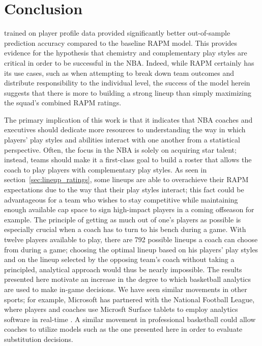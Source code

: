 \chapter{Conclusion}
\label{conclusion}

 trained on player
profile data provided significantly better out-of-sample prediction accuracy
compared to the baseline RAPM model. This provides evidence for the hypothesis that
chemistry and complementary play styles are critical in order to be successful in
the NBA.  Indeed, while RAPM certainly has its use cases, such as when attempting to
break down team outcomes and distribute responsibility to the individual level, the
success of the model herein suggests that there is more to building a strong lineup
than simply maximizing the squad's combined RAPM ratings.

The primary implication of this work is that it indicates that NBA coaches and
executives should dedicate more resources to understanding the way in which players'
play styles and abilities interact with one another from a statistical perspective.
Often, the focus in the NBA is solely on acquiring star talent; instead, teams
should make it a first-class goal to build a roster that allows the coach to play
players with complementary play styles. As seen in section~\ref{sec:lineup_ratings},
some lineups are able to overachieve their RAPM expectations due to the way that
their play styles interact; this fact could be advantageous for a team who wishes to
stay competitive while maintaining enough available cap space to sign high-impact
players in a coming offseason for example.  The principle of getting as much out of
one's players as possible is especially crucial when a coach has to turn to his
bench during a game. With twelve players available to play, there are 792 possible
lineups a coach can choose from during a game; choosing the optimal lineup based on
his players' play styles and on the lineup selected by the opposing team's coach
without taking a principled, analytical approach would thus be nearly impossible.
The results presented here motivate an increase in the degree to which basketball
analytics are used to make in-game decisions. We have seen similar movements in
other sports; for example, Microsoft has partnered with the National Football
League, where players and coaches use Microsft Surface tablets to employ analytics
software in real-time \cite{Geekwire}.  A similar movement in professional
basketball could allow coaches to utilize models such as the one presented here in
order to evaluate substitution decisions.

